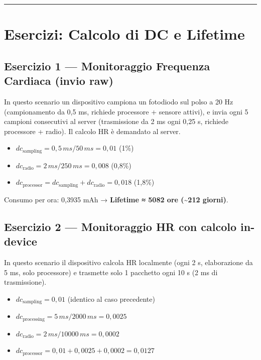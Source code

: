 \documentclass[
  italian,
  openany]{book}
\providecommand{\tightlist}{%
  \setlength{\itemsep}{0pt}\setlength{\parskip}{0pt}}
\begin{document}
\begin{center}\rule{0.5\linewidth}{0.5pt}\end{center}

\section{Esercizi: Calcolo di DC e
Lifetime}\label{esercizi-calcolo-di-dc-e-lifetime}

\subsection{Esercizio 1 --- Monitoraggio Frequenza Cardiaca (invio
raw)}\label{esercizio-1-monitoraggio-frequenza-cardiaca-invio-raw}

In questo scenario un dispositivo campiona un fotodiodo sul polso a 20
Hz (campionamento da 0,5 ms, richiede processore + sensore attivi), e
invia ogni 5 campioni consecutivi al server (trasmissione da 2 ms ogni
0,25 s, richiede processore + radio). Il calcolo HR è demandato al
server.

\begin{itemize}
\tightlist
\item
  \(dc_\text{sampling} = 0,5\,ms / 50\,ms = 0,01\) (1\%)
\item
  \(dc_\text{radio} = 2\,ms / 250\,ms = 0,008\) (0,8\%)
\item
  \(dc_\text{processor} = dc_\text{sampling} + dc_\text{radio} = 0,018\)
  (1,8\%)
\end{itemize}

Consumo per ora: 0,3935 mAh → \textbf{Lifetime ≈ 5082 ore
(\textasciitilde212 giorni)}.

\subsection{Esercizio 2 --- Monitoraggio HR con calcolo
in-device}\label{esercizio-2-monitoraggio-hr-con-calcolo-in-device}

In questo scenario il dispositivo calcola HR localmente (ogni 2 s,
elaborazione da 5 ms, solo processore) e trasmette solo 1 pacchetto ogni
10 s (2 ms di trasmissione).

\begin{itemize}
\tightlist
\item
  \(dc_\text{sampling} = 0,01\) (identico al caso precedente)
\item
  \(dc_\text{processing} = 5\,ms / 2000\,ms = 0,0025\)
\item
  \(dc_\text{radio} = 2\,ms / 10000\,ms = 0,0002\)
\item
  \(dc_\text{processor} = 0,01 + 0,0025 + 0,0002 = 0,0127\)
\end{itemize}
\end{document}
